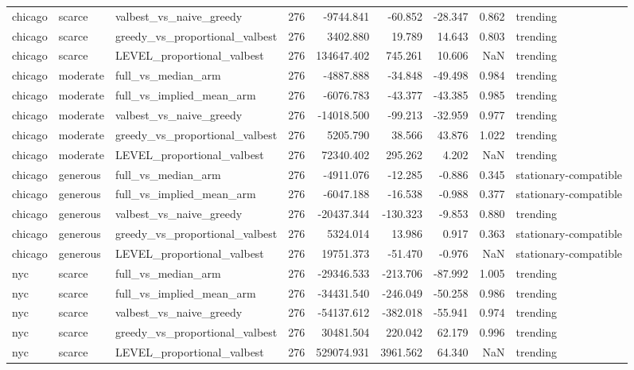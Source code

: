 \begin{tabular}{lllrrrrrl}
chicago & scarce & valbest\_vs\_naive\_greedy & 276 & -9744.841 & -60.852 & -28.347 & 0.862 & trending \\
chicago & scarce & greedy\_vs\_proportional\_valbest & 276 & 3402.880 & 19.789 & 14.643 & 0.803 & trending \\
chicago & scarce & LEVEL\_proportional\_valbest & 276 & 134647.402 & 745.261 & 10.606 & NaN & trending \\
chicago & moderate & full\_vs\_median\_arm & 276 & -4887.888 & -34.848 & -49.498 & 0.984 & trending \\
chicago & moderate & full\_vs\_implied\_mean\_arm & 276 & -6076.783 & -43.377 & -43.385 & 0.985 & trending \\
chicago & moderate & valbest\_vs\_naive\_greedy & 276 & -14018.500 & -99.213 & -32.959 & 0.977 & trending \\
chicago & moderate & greedy\_vs\_proportional\_valbest & 276 & 5205.790 & 38.566 & 43.876 & 1.022 & trending \\
chicago & moderate & LEVEL\_proportional\_valbest & 276 & 72340.402 & 295.262 & 4.202 & NaN & trending \\
chicago & generous & full\_vs\_median\_arm & 276 & -4911.076 & -12.285 & -0.886 & 0.345 & stationary-compatible \\
chicago & generous & full\_vs\_implied\_mean\_arm & 276 & -6047.188 & -16.538 & -0.988 & 0.377 & stationary-compatible \\
chicago & generous & valbest\_vs\_naive\_greedy & 276 & -20437.344 & -130.323 & -9.853 & 0.880 & trending \\
chicago & generous & greedy\_vs\_proportional\_valbest & 276 & 5324.014 & 13.986 & 0.917 & 0.363 & stationary-compatible \\
chicago & generous & LEVEL\_proportional\_valbest & 276 & 19751.373 & -51.470 & -0.976 & NaN & stationary-compatible \\
nyc & scarce & full\_vs\_median\_arm & 276 & -29346.533 & -213.706 & -87.992 & 1.005 & trending \\
nyc & scarce & full\_vs\_implied\_mean\_arm & 276 & -34431.540 & -246.049 & -50.258 & 0.986 & trending \\
nyc & scarce & valbest\_vs\_naive\_greedy & 276 & -54137.612 & -382.018 & -55.941 & 0.974 & trending \\
nyc & scarce & greedy\_vs\_proportional\_valbest & 276 & 30481.504 & 220.042 & 62.179 & 0.996 & trending \\
nyc & scarce & LEVEL\_proportional\_valbest & 276 & 529074.931 & 3961.562 & 64.340 & NaN & trending \\

\end{tabular}
